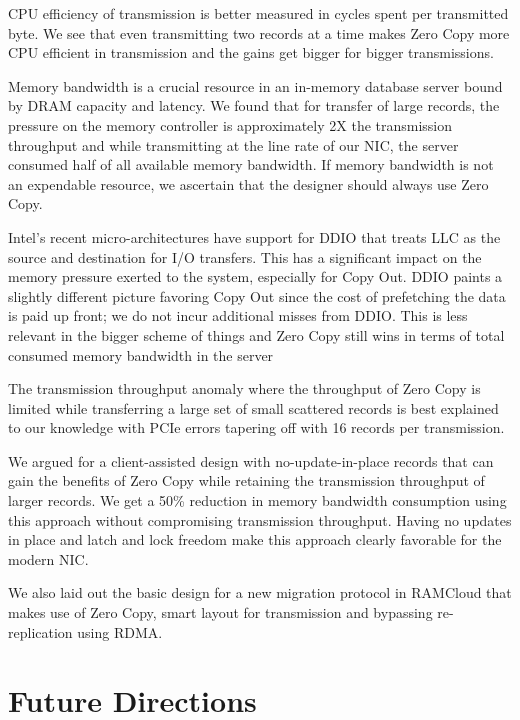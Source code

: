 CPU efficiency of transmission is better measured in cycles spent per transmitted byte. We see that even transmitting two records at a time makes 
Zero Copy more CPU efficient in transmission and the gains get bigger for bigger transmissions.

Memory bandwidth is a crucial resource in an in-memory database server bound by DRAM capacity and latency. We found that for transfer of large 
records, the pressure on the memory controller is approximately 2X the transmission throughput and while transmitting at the line rate of our NIC, 
the server consumed half of all available memory bandwidth. If memory bandwidth is not an expendable resource, we ascertain that the designer should 
always use Zero Copy.
  
Intel\textregistered's recent micro-architectures have support for DDIO that treats LLC as the source and destination for I/O transfers. This has a significant impact on 
the memory pressure exerted to the system, especially for Copy Out. DDIO paints a slightly different picture favoring Copy Out since the cost of prefetching the data is 
paid up front; we do not incur additional misses from DDIO. This is less relevant in the bigger scheme of things and Zero Copy still wins in terms of total 
consumed memory bandwidth in the server
  
The transmission throughput anomaly where the throughput of Zero Copy is limited while transferring a large set of small scattered records is best explained to 
our knowledge with PCIe errors tapering off with 16 records per transmission.
 
We argued for a client-assisted design with no-update-in-place records that can gain the benefits of Zero Copy while retaining the transmission throughput of larger records. 
We get a 50\% reduction in memory bandwidth consumption using this approach without compromising transmission throughput. 
Having no updates in place and latch and lock freedom make this approach clearly favorable for the modern NIC. 

We also laid out the basic design for a new migration protocol in RAMCloud that makes use of Zero Copy, smart layout for transmission and bypassing re-replication using 
RDMA.

\section{Future Directions}

